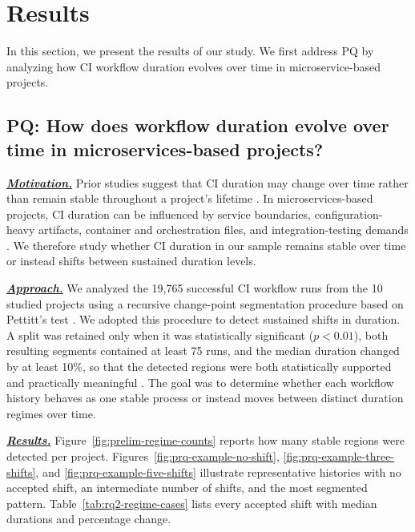 \documentclass[conference]{IEEEconf}
\begin{document}
\section{Results}
In this section, we present the results of our study. We first address PQ by analyzing how CI workflow duration evolves over time in microservice-based projects.

\subsection{PQ: How does workflow duration evolve over time in microservices-based projects?}
\noindent\underline{\textbf{\textit{Motivation.}}} Prior studies suggest that CI duration may change over time rather than remain stable throughout a project's lifetime \cite{bernardo2024gha,ghaleb2023interplay}. In microservices-based projects, CI duration can be influenced by service boundaries, configuration-heavy artifacts, container and orchestration files, and integration-testing demands \cite{newman2021building,taibi2019continuous,baresi2022docker,reile2022bunk8s}. We therefore study whether CI duration in our sample remains stable over time or instead shifts between sustained duration levels.

\noindent\underline{\textbf{\textit{Approach.}}} We analyzed the 19,765 successful CI workflow runs from the 10 studied projects using a recursive change-point segmentation procedure based on Pettitt's test \cite{Pettitt1979}. We adopted this procedure to detect sustained shifts in duration. A split was retained only when it was statistically significant ($p < 0.01$), both resulting segments contained at least 75 runs, and the median duration changed by at least 10\%, so that the detected regions were both statistically supported and practically meaningful \cite{Mailhot2025RatingCurves}. The goal was to determine whether each workflow history behaves as one stable process or instead moves between distinct duration regimes over time.

\noindent\underline{\textbf{\textit{Results.}}} Figure~\ref{fig:prelim-regime-counts} reports how many stable regions were detected per project. Figures~\ref{fig:prq-example-no-shift}, \ref{fig:prq-example-three-shifts}, and \ref{fig:prq-example-five-shifts} illustrate representative histories with no accepted shift, an intermediate number of shifts, and the most segmented pattern. Table~\ref{tab:rq2-regime-cases} lists every accepted shift with median durations and percentage change.
\end{document}
